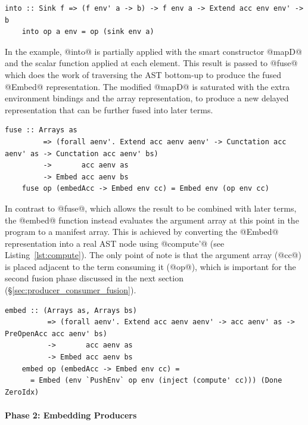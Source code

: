 \begin{lstlisting}[style=haskell,name=embedPreAcc]
    into :: Sink f => (f env' a -> b) -> f env a -> Extend acc env env' -> b
    into op a env = op (sink env a)
\end{lstlisting}

In the example, @into@ is partially applied with the smart constructor
@mapD@ and the scalar function applied at each element. This result is
passed to @fuse@ which does the work of traversing the AST bottom-up to produce the fused @Embed@ representation. The
modified @mapD@ is saturated with the extra environment bindings and the
array representation, to produce a new delayed representation that can be
further fused into later terms.

\begin{lstlisting}[style=haskell,name=embedPreAcc]
    fuse :: Arrays as
         => (forall aenv'. Extend acc aenv aenv' -> Cunctation acc aenv' as -> Cunctation acc aenv' bs)
         ->       acc aenv as
         -> Embed acc aenv bs
    fuse op (embedAcc -> Embed env cc) = Embed env (op env cc)
\end{lstlisting}

In contrast to @fuse@, which allows the result to be combined with later
terms, the @embed@ function instead evaluates the argument array at this
point in the program to a manifest array. This is achieved by converting the
@Embed@ representation into a real AST node
using @compute'@ (see Listing~\ref{lst:compute}). The only point of note is
that the argument array (@cc@) is placed adjacent to the term consuming it
(@op@), which is important for the second fusion phase discussed in the
next section (\S\ref{sec:producer_consumer_fusion}).

\begin{lstlisting}[style=haskell
    ,name=embedPreAcc
    ,caption={Producer fusion via bottom-up contraction of the AST}]
    embed :: (Arrays as, Arrays bs)
          => (forall aenv'. Extend acc aenv aenv' -> acc aenv' as -> PreOpenAcc acc aenv' bs)
          ->       acc aenv as
          -> Embed acc aenv bs
    embed op (embedAcc -> Embed env cc) =
      = Embed (env `PushEnv` op env (inject (compute' cc))) (Done ZeroIdx)
\end{lstlisting}

\paragraph{Phase 2: Embedding Producers}
\label{sec:embedding_producers}


